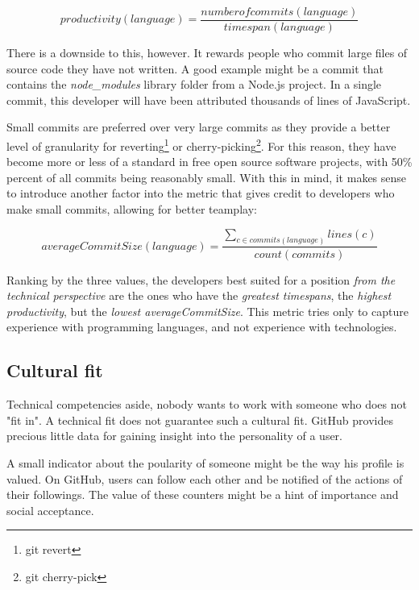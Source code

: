 \begin{equation}
productivity(language) = \frac{numberofcommits(language)}{timespan(language)}
\label{eq:productivity}
\end{equation}

There is a downside to this, however. It rewards people who commit large files of source code they have not written. A good example might be a commit that contains the \textit{node\_modules} library folder from a Node.js project. In a single commit, this developer will have been attributed thousands of lines of JavaScript.

Small commits are preferred \cite{so:commitsize} over very large commits as they provide a better level of granularity for reverting\footnote{git revert} or cherry-picking\footnote{git cherry-pick}. For this reason, they have become more or less of a standard in free  open source software projects, with 50\% percent of all commits being reasonably small\cite{rsk:2014}. With this in mind, it makes sense to introduce another factor into the metric that gives credit to developers who make small commits, allowing for better teamplay:

\begin{equation}
averageCommitSize(language) = \frac{\sum_{c \in commits(language)} lines(c)}{count(commits)}
\label {eq:avgcommitsize}
\end{equation}

Ranking by the three values, the developers best suited for a position \textit{from the technical perspective} are the ones who have the \textit{greatest timespans}, the \textit{highest productivity}, but the \textit{lowest averageCommitSize}. This metric tries only to capture experience with programming languages, and not experience with technologies.

\subsection{Cultural fit}
Technical competencies aside, nobody wants to work with someone who does not "fit in".
A technical fit does not guarantee such a cultural fit. GitHub provides precious little data for gaining insight into the personality of a user.
\newline

A small indicator about the poularity of someone might be the way his profile is valued. On GitHub, users can follow each other and be notified of the actions of their followings. The value of these counters might be a hint of importance and social acceptance.
\newline

